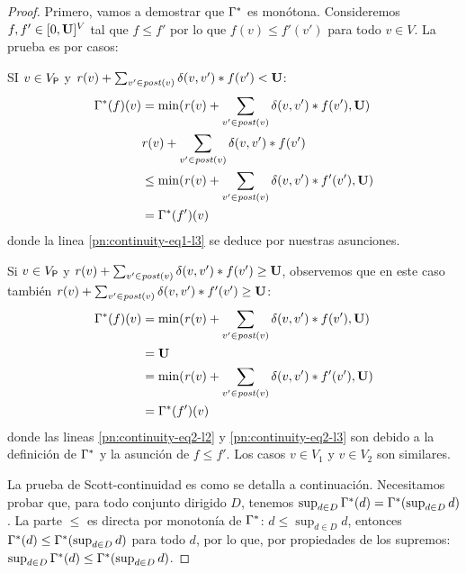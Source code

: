 \begin{proof}
    
    Primero, vamos a demostrar que $\Gamma^*$ es monótona. Consideremos $f,f' \in [0,\mathbf{U}]^V$  tal que
$f \leq f'$ por lo que $f(v) \leq f'(v')$ para todo $v \in V$.  La prueba es por casos:

    SI $v \in V_{\mathsf{P}}$ y $\mathit{r}(v) + \sum_{v' \in \mathit{post}(v)} \delta(v,v')* f(v') < \mathbf{U}$:
\begin{align}
    \Gamma^*(f)(v) & = \min (\mathit{r}(v) + \sum_{v' \in \mathit{post}(v)} \delta(v,v')* f(v'), \mathbf{U})\label{pn:continuity-eq1-l1} \\
            & \mathit{r}(v) + \sum_{v' \in \mathit{post}(v)} \delta(v,v')* f(v') \label{pn:continuity-eq1-l2} \\
           & \leq \min (\mathit{r}(v) + \sum_{v' \in \mathit{post}(v)} \delta(v,v') * f'(v'), \mathbf{U})          \label{pn:continuity-eq1-l3} \\
           & = \Gamma^*(f')(v)  
\end{align}
    donde la linea \ref{pn:continuity-eq1-l3} se deduce por nuestras asunciones.
   
    Si $v \in V_{\mathsf{P}}$ y $\mathit{r}(v) + \sum_{v' \in \mathit{post}(v)} \delta(v,v')* f(v') \geq \mathbf{U}$, observemos que en este caso también $\mathit{r}(v) + \sum_{v' \in \mathit{post}(v)} \delta(v,v')* f'(v') \geq \mathbf{U}$:
\begin{align}
    \Gamma^*(f)(v) & = \min(\mathit{r}(v) + \sum_{v' \in \mathit{post}(v)} \delta(v,v')* f(v'), \mathbf{U}) \label{pn:continuity-eq2-l1} \\
                            & = \mathbf{U}                                                                  \label{pn:continuity-eq2-l2} \\
                            & = \min( \mathit{r}(v) + \sum_{v' \in \mathit{post}(v)} \delta(v,v') * f'(v'), \mathbf{U}) \label{pn:continuity-eq2-l3} \\
                            & = \Gamma^*(f')(v)   \label{pn:continuity-eq2-l4}
\end{align}
donde las lineas \ref{pn:continuity-eq2-l2} y  \ref{pn:continuity-eq2-l3} son debido a la definición de $\Gamma^*$ y la asunción de $f \leq f'$.
    Los casos $v \in V_1$ y $v \in V_2$ son similares.
    
    La prueba de Scott-continuidad es como se detalla a continuación. Necesitamos probar que, para todo conjunto dirigido $D$, tenemos $\sup_{d \in D} \Gamma^*(d) =  \Gamma^*(\sup_{d \in D} d)$.
    La parte $\leq$ es directa por monotonía de $\Gamma^*$: $d \leq \sup_{d \in D} d$, entonces $\Gamma^*(d) \leq \Gamma^*( \sup_{d \in D} d)$ para todo $d$,
    por lo que, por propiedades de los supremos: $\sup_{d \in D} \Gamma^*(d) \leq  \Gamma^*(\sup_{d \in D} d)$.
    

\end{proof}
